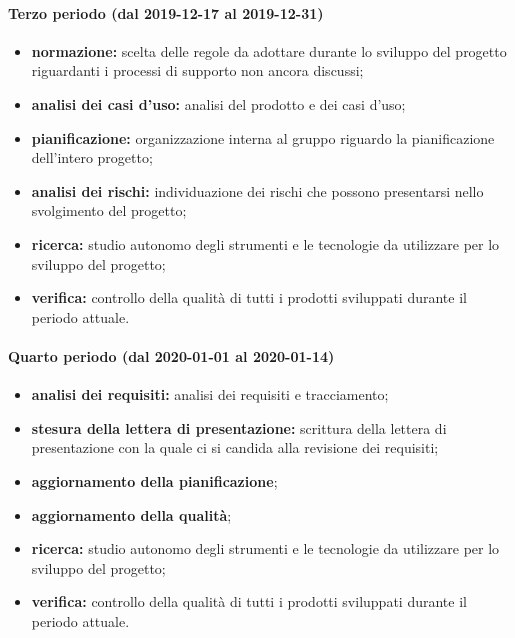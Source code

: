 			\paragraph{Terzo periodo (dal 2019-12-17 al 2019-12-31)}
			
				\begin{itemize}
					\item \textbf{normazione:} scelta delle regole da adottare durante lo sviluppo del progetto riguardanti i processi di supporto non ancora discussi;
					\item \textbf{analisi dei casi d'uso:} analisi del prodotto e dei casi d'uso;
					\item \textbf{pianificazione:} organizzazione interna al gruppo riguardo la pianificazione dell'intero progetto;
					\item \textbf{analisi dei rischi:} individuazione dei rischi che possono presentarsi nello svolgimento del progetto;
					\item \textbf{ricerca:} studio autonomo degli strumenti e le tecnologie da utilizzare per lo sviluppo del progetto;
					\item \textbf{verifica:} controllo della qualità di tutti i prodotti sviluppati durante il periodo attuale.
				\end{itemize}
			
			\paragraph{Quarto periodo (dal 2020-01-01 al 2020-01-14)}
			
				\begin{itemize}
					\item \textbf{analisi dei requisiti:} analisi dei requisiti e tracciamento;
					\item \textbf{stesura della lettera di presentazione:} scrittura della lettera di presentazione con la quale ci si candida alla revisione dei requisiti;
					\item \textbf{aggiornamento della pianificazione};
					\item \textbf{aggiornamento della qualità};
					\item \textbf{ricerca:} studio autonomo degli strumenti e le tecnologie da utilizzare per lo sviluppo del progetto;
					\item \textbf{verifica:} controllo della qualità di tutti i prodotti sviluppati durante il periodo attuale.
				\end{itemize}
        
